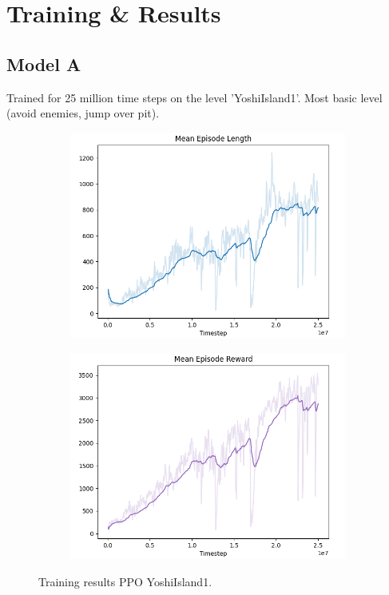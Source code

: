 \documentclass[a4paper]{article}
\begin{document}
\section{Training \& Results} \label{s:training-results}
\subsection{Model A}
Trained for 25 million time steps on the level 'YoshiIsland1'.
Most basic level (avoid enemies, jump over pit).
\begin{figure}[htbp]
    \centering
    \begin{subfigure}{.5\textwidth}
        \centering
        \includegraphics[width=\textwidth]{PPO_YoshiIsland1_len}
        \label{fig:result1:sub1}
    \end{subfigure}%
    \begin{subfigure}{.5\textwidth}
        \centering
        \includegraphics[width=\textwidth]{PPO_YoshiIsland1_rew}
        \label{fig:result1:sub2}
    \end{subfigure}
    \caption{Training results PPO YoshiIsland1.}
    \label{fig:result1}
\end{figure}
\end{document}
